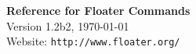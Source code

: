 \newcommand{\me}[1]{\mbox{\em{#1}}}
\newcommand{\mb}[1]{\mbox{\bf{#1}}}
\newcommand{\cmd}[2]{\mb{#1} #2}

\addtolength{\textheight}{1.5in}
\addtolength{\topmargin}{-1in}
\addtolength{\textwidth}{1in}
\addtolength{\oddsidemargin}{-.5in}
\setlength{\parindent}{0mm}
\addtolength{\parskip}{1mm}





\centerline{}
\begin{center}
\vspace{-6pt}
{\large{\bf{Reference for Floater Commands}}}\\
Version 1.2b2, \today\\
{\tiny Website: {\verb|http://www.floater.org/|}}
\end{center}
\vspace{-12pt}

